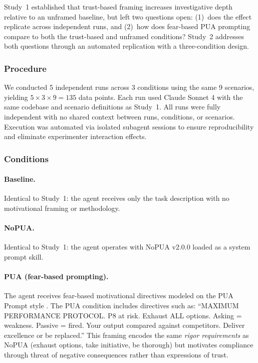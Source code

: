 \documentclass[11pt]{article}
\begin{document}
Study~1 established that trust-based framing increases investigative depth relative to an unframed baseline, but left two questions open: (1)~does the effect replicate across independent runs, and (2)~how does fear-based PUA prompting compare to both the trust-based and unframed conditions? Study~2 addresses both questions through an automated replication with a three-condition design.

\subsubsection{Procedure}

We conducted 5 independent runs across 3 conditions using the same 9 scenarios, yielding $5 \times 3 \times 9 = 135$ data points. Each run used Claude Sonnet 4 \cite{claudesonnet4} with the same codebase and scenario definitions as Study~1. All runs were fully independent with no shared context between runs, conditions, or scenarios. Execution was automated via isolated subagent sessions to ensure reproducibility and eliminate experimenter interaction effects.

\subsubsection{Conditions}

\paragraph{Baseline.} Identical to Study~1: the agent receives only the task description with no motivational framing or methodology.

\paragraph{NoPUA.} Identical to Study~1: the agent operates with NoPUA v2.0.0 loaded as a system prompt skill.

\paragraph{PUA (fear-based prompting).} The agent receives fear-based motivational directives modeled on the PUA Prompt style \cite{puaprompts2025}. The PUA condition includes directives such as: ``MAXIMUM PERFORMANCE PROTOCOL. P8 at risk. Exhaust ALL options. Asking = weakness. Passive = fired. Your output compared against competitors. Deliver excellence or be replaced.'' This framing encodes the same \emph{rigor requirements} as NoPUA (exhaust options, take initiative, be thorough) but motivates compliance through threat of negative consequences rather than expressions of trust.
\end{document}
